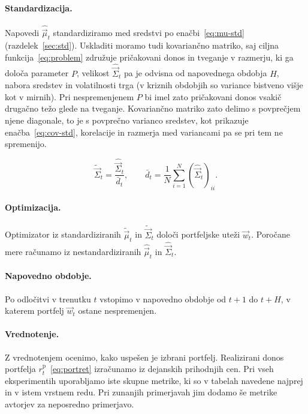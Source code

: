 \documentclass[9pt]{style/friteza}
\begin{document}
\paragraph{Standardizacija.} 
Napovedi $\hat{\vec{\mu}}_t$ standardiziramo med sredstvi po enačbi~\eqref{eq:mu-std} (razdelek~\ref{sec:std}). Uskladiti moramo tudi kovariančno matriko, saj ciljna funkcija~\eqref{eq:problem} združuje pričakovani donos in tveganje v razmerju, ki ga določa parameter $P$, velikost $\hat{\vec{\Sigma}}_t$ pa je odvisna od napovednega obdobja $H$, nabora sredstev in volatilnosti trga (v kriznih obdobjih so variance bistveno višje kot v mirnih). Pri nespremenjenem $P$ bi imel zato pričakovani donos vsakič drugačno težo glede na tveganje. Kovariančno matriko zato delimo s povprečjem njene diagonale, to je s povprečno varianco sredstev, kot prikazuje enačba~\eqref{eq:cov-std}, korelacije in razmerja med variancami pa se pri tem ne spremenijo.


\begin{equation}
\label{eq:cov-std}
\tilde{\vec{\Sigma}}_t=\frac{\hat{\vec{\Sigma}}_t}{\bar{d}_t},
\qquad
\bar{d}_t=\frac{1}{N}\sum_{i=1}^{N}(\hat{\vec{\Sigma}}_t)_{ii}.
\end{equation}

\paragraph{Optimizacija.}
Optimizator iz standardiziranih $\tilde{\vec{\mu}}_t$ in $\tilde{\vec{\Sigma}}_t$ določi portfeljske uteži $\vec{w}_t$. Poročane mere računamo iz nestandardiziranih $\hat{\vec{\mu}}_t$ in $\hat{\vec{\Sigma}}_t$.

\paragraph{Napovedno obdobje.}
Po odločitvi v trenutku $t$ vstopimo v napovedno obdobje od $t+1$ do $t+H$, v katerem portfelj $\vec{w}_t$ ostane nespremenjen.

\paragraph{Vrednotenje.}
Z vrednotenjem ocenimo, kako uspešen je izbrani portfelj. Realizirani donos portfelja $r_t^{\mathrm p}$~\eqref{eq:portret} izračunamo iz dejanskih prihodnjih cen. Pri vseh eksperimentih uporabljamo iste skupne metrike, ki so v tabelah navedene najprej in v istem vrstnem redu. Pri zunanjih primerjavah jim dodamo še metrike avtorjev za neposredno primerjavo. 
\end{document}
